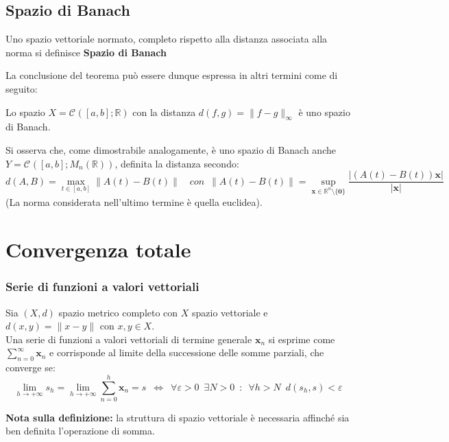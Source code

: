 \documentclass[10pt, oneside]{book}
\theoremstyle{plain}
\begin{document}
\subsection{Spazio di Banach}
\begin{defin}
Uno spazio vettoriale normato, completo rispetto alla distanza associata alla norma si definisce \textbf{Spazio di Banach}
\end{defin}
La conclusione del teorema può essere dunque espressa in altri termini come di seguito:
\begin{ther}
Lo spazio $X = \mathcal{C}^{}([a,b] ; \mathbb{R})$ con la distanza $d(f,g) = \|f - g\|_\infty$ è uno spazio di Banach.
\end{ther}
Si osserva che, come dimostrabile analogamente, è uno spazio di Banach anche $Y = \mathcal{C}^{}([a,b] ; M_n(\mathbb{R}))$, definita la distanza secondo:
\[d(A,B) = \max\limits_{t \in [a,b]}\|A(t) - B(t)\| \quad con \enspace \|A(t) - B(t)\| = \sup\limits_{\mathbf{x} \in \mathbb{R}^n\setminus \{\mathbf{0}\}}\frac{|(A(t) - B(t)) \mathbf{x}|}{|\mathbf{x}|}\]
(La norma considerata nell'ultimo termine è quella euclidea).
\newpage
\section{Convergenza totale}

\subsubsection{Serie di funzioni a valori vettoriali}
\begin{defin}
Sia $(X,d)$ spazio metrico completo con $X$ spazio vettoriale e $d(x, y) = \|x - y\|$ con $x, y \in X$.
\\Una serie di funzioni a valori vettoriali di termine generale $\mathbf{x}_n$ si esprime come $\displaystyle \sum\limits_{n=0}^\infty \mathbf{x}_n$ e corrisponde al limite della successione delle somme parziali, che converge se:
\[\lim\limits_{h \rightarrow +\infty} s_h = \lim\limits_{h \rightarrow +\infty} \sum\limits_{n=0}^h \mathbf{x}_n = s \enspace \Leftrightarrow \enspace \forall \varepsilon > 0 \enspace \exists N > 0 \enspace : \enspace \forall h > N \enspace d(s_h,s) < \varepsilon\]
\end{defin}
\textbf{Nota sulla definizione: } la struttura di spazio vettoriale è necessaria affinché sia ben definita l'operazione di somma.
\end{document}
